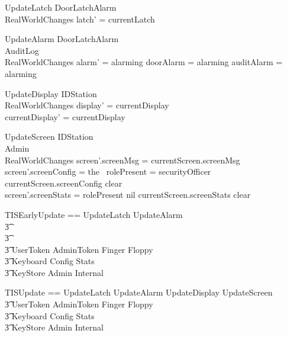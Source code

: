 \begin{schema}{UpdateLatch}
	\Xi DoorLatchAlarm
\\	RealWorldChanges
\where
	latch' = currentLatch
\end{schema}

\begin{schema}{UpdateAlarm}
	\Xi DoorLatchAlarm
\\      AuditLog
\\	RealWorldChanges
\where
        alarm' = alarming \iff doorAlarm = alarming \lor auditAlarm = alarming 
\end{schema}

\begin{schema}{UpdateDisplay}
	\Delta IDStation
\\	RealWorldChanges
\where
	display' = currentDisplay
\\      currentDisplay' = currentDisplay
\end{schema}

\begin{schema}{UpdateScreen}
        \Delta IDStation
\\      \Xi Admin
\\      RealWorldChanges
\where
           screen'.screenMsg = currentScreen.screenMsg
\\           screen'.screenConfig = \IF the~ rolePresent =
securityOfficer \THEN currentScreen.screenConfig \ELSE clear 
\\            screen'.screenStats = \IF rolePresent \neq nil
\THEN currentScreen.screenStats \ELSE clear
\end{schema}

\begin{zed}
        TISEarlyUpdate == UpdateLatch \land UpdateAlarm 
\\ \t3        \land [~ RealWorldChanges | screen' = screen \land
        display' = display ~]
\\ \t3   \land [\Delta IDStation | currentDisplay = currentDisplay' ]
\\ \t3 \land \Xi UserToken \land \Xi AdminToken \land \Xi Finger \land
\Xi Floppy \land 
\\ \t3  \Xi Keyboard \land \Xi Config \land
\Xi Stats  
\\ \t3 \land \Xi KeyStore \land \Xi Admin \land \Xi Internal
\end{zed}

\begin{zed}
        TISUpdate == UpdateLatch \land UpdateAlarm \land UpdateDisplay \land UpdateScreen
\\ \t3 \land \Xi UserToken \land \Xi AdminToken \land \Xi Finger \land
\Xi Floppy \land 
\\ \t3  \Xi Keyboard \land \Xi Config \land
\Xi Stats  
\\ \t3 \land \Xi KeyStore \land \Xi Admin \land \Xi Internal
\end{zed}

